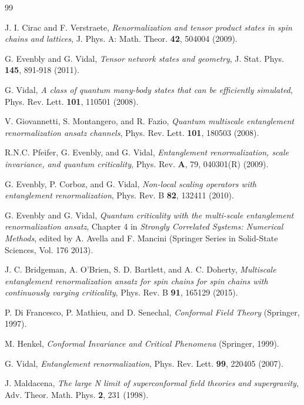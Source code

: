 \documentclass[aps,prl,twocolumn,showpacs,superscriptaddress,floatfix,10pt]{revtex4-1}
\begin{document}
\begin{thebibliography}{99}

J. I. Cirac and F. Verstraete, {\it Renormalization and tensor product states in spin chains and lattices}, J. Phys. A: Math. Theor. {\bf 42}, 504004 (2009).

G. Evenbly and G. Vidal, {\it Tensor network states and geometry}, J. Stat. Phys. {\bf 145}, 891-918 (2011).

G. Vidal, {\it A class of quantum many-body states that can be efficiently simulated}, Phys. Rev. Lett. {\bf 101}, 110501 (2008).

V. Giovannetti, S. Montangero, and R. Fazio, {\it Quantum multiscale entanglement renormalization ansatz channels}, Phys. Rev. Lett. {\bf 101}, 180503 (2008).

R.N.C. Pfeifer, G. Evenbly, and G. Vidal, {\it Entanglement renormalization, scale invariance, and quantum criticality}, Phys. Rev. {\bf A}, 79, 040301(R) (2009).

G. Evenbly, P. Corboz, and G. Vidal, {\it Non-local scaling operators with entanglement renormalization}, Phys. Rev. B {\bf 82}, 132411 (2010).

G. Evenbly and G. Vidal, {\it Quantum criticality with the multi-scale entanglement renormalization ansatz}, Chapter 4 in \textit{Strongly Correlated Systems: Numerical Methods}, edited by A. Avella and F. Mancini (Springer Series in Solid-State Sciences, Vol. 176 2013).

J. C. Bridgeman, A. O'Brien, S. D. Bartlett, and A. C. Doherty, {\it Multiscale entanglement renormalization ansatz for spin chains for spin chains with continuously varying criticality}, Phys. Rev. B {\bf 91}, 165129 (2015).

P. Di Francesco, P. Mathieu, and D. Senechal, {\it Conformal Field Theory} (Springer, 1997).

M. Henkel, {\it Conformal Invariance and Critical Phenomena} (Springer, 1999).

G. Vidal, {\it Entanglement renormalization}, Phys. Rev. Lett. {\bf 99}, 220405 (2007).

J. Maldacena, {\it The large N limit of superconformal field theories and supergravity}, Adv. Theor. Math. Phys. \textbf{2}, 231 (1998).


\end{thebibliography}
\end{document}
